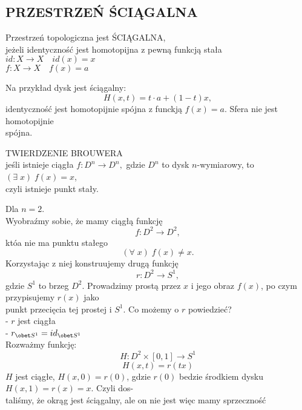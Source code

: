 \subsection{PRZESTRZEŃ ŚCIĄGALNA}
\begin{center}\large
    Przestrzeń topologiczna jest {\color{def}ŚCIĄGALNA,} \\jeżeli identyczność jest homotopijna z pewną funkcją stała\smallskip\\
    $id:X\to X\quad id(x) = x$\smallskip\\
    $f:X\to X\quad f(x)=a$
\end{center}\bigskip
Na przykład dysk jest ściągalny:
$$H(x, t)=t\cdot a+(1-t)x,$$
identyczność jest homotopijnie spójna z funckją $f(x)=a$. Sfera nie jest homotopijnie \\spójna.\bigskip\\
\bigskip
\begin{center}\large
    {\color{def}TWIERDZENIE BROUWERA}\smallskip\\
    jeśli istnieje ciągła
    $f:D^n\to D^n,$
    gdzie $D^n$ to dysk $n$-wymiarowy, to\smallskip\\
    $(\exists\;x)\;f(x)=x$,\smallskip\\
    czyli istnieje punkt stały.
\end{center}
\dowod
Dla $n=2$.\medskip\\
Wyobraźmy sobie, że mamy ciągłą funkcję
$$f:D^2\to D^2,$$
któa nie ma punktu stałego
$$(\forall\;x)\;f(x)\neq x.$$
Korzystając z niej konstruujemy drugą funkcję
$$r:D^2\to S^1,$$
gdzie $S^1$ to brzeg $D^2$. Prowadzimy prostą przez $x$ i jego obraz $f(x)$, po czym przypisujemy $r(x)$ jako \\punkt przecięcia tej prostej i $S^1$. Co możemy o $r$ powiedzieć?\medskip\\
\indent - $r$ jest ciągła\smallskip\\
\indent - $r_{\obet S^1}= id_{\obet S^1}$\medskip\\
Rozważmy funkcję:
$$H:D^2\times[0,1]\to S^1$$
$$H(x, t)=r(tx)$$
$H$ jest ciągłe, $H(x, 0) = r(0)$, gdzie $r(0)$ bedzie środkiem dysku $H(x,1)=r(x) = x$. Czyli dos-\\taliśmy, że okrąg jest ściągalny, ale on nie jest więc mamy sprzeczność
\kondow